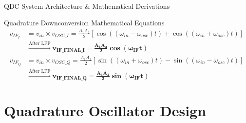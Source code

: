 \documentclass{beamer}
\begin{document}
\begin{frame}{QDC System Architecture \& Mathematical Derivations}
  \vspace{0.05cm}
  \begin{block}{\small Quadrature Downconversion Mathematical Equations}
    \scriptsize
    \setlength{\abovedisplayskip}{2pt}
    \setlength{\belowdisplayskip}{2pt}
    \begin{align*}
      v_{IF_I} &= v_{in} \times v_{OSC\_I} = \frac{A_1 A_2}{2}\left[\cos((\omega_{in}-\omega_{osc})t) + \cos((\omega_{in}+\omega_{osc})t)\right] \\
               &\xrightarrow{\text{After LPF}} \mathbf{v_{IF\_FINAL\_I} = \frac{A_1 A_2}{2}\cos(\omega_{IF}t)} \\[0.05cm]
      v_{IF_Q} &= v_{in} \times v_{OSC\_Q} = \frac{A_1 A_2}{2}\left[\sin((\omega_{in}+\omega_{osc})t) - \sin((\omega_{in}-\omega_{osc})t)\right] \\
               &\xrightarrow{\text{After LPF}} \mathbf{v_{IF\_FINAL\_Q} = \frac{A_1 A_2}{2}\sin(\omega_{IF}t)}
    \end{align*}
  \end{block}
\end{frame}

\section{Quadrature Oscillator Design}
\end{document}
